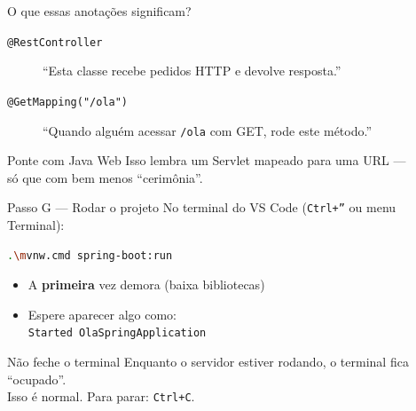 \documentclass[aspectratio=169,11pt]{beamer}
\begin{document}
\begin{frame}{O que essas anotações significam?}
  \begin{description}
    \item[\texttt{@RestController}]
      “Esta classe recebe pedidos HTTP e devolve resposta.”
    \item[\texttt{@GetMapping("/ola")}]
      “Quando alguém acessar \texttt{/ola} com GET, rode este método.”
  \end{description}

  \vspace{0.8em}
  \begin{block}{Ponte com Java Web}
    Isso lembra um Servlet mapeado para uma URL ---\\
    só que com bem menos “cerimônia”.
  \end{block}
\end{frame}

\begin{frame}[fragile]{Passo G --- Rodar o projeto}
  No terminal do VS Code (\texttt{Ctrl+''} ou menu Terminal):

\begin{lstlisting}[language=bash]
.\mvnw.cmd spring-boot:run
\end{lstlisting}

  \vspace{0.4em}
  \begin{itemize}
    \item A \textbf{primeira} vez demora (baixa bibliotecas)
    \item Espere aparecer algo como:\\
          \texttt{Started OlaSpringApplication}
  \end{itemize}

  \vspace{0.5em}
  \begin{alertblock}{Não feche o terminal}
    Enquanto o servidor estiver rodando, o terminal fica “ocupado”.\\
    Isso é normal. Para parar: \texttt{Ctrl+C}.
  \end{alertblock}
\end{frame}
\end{document}
